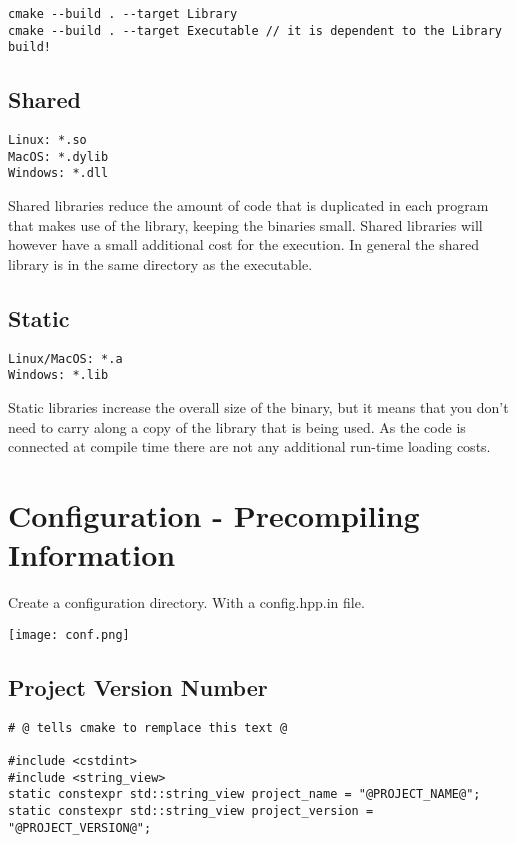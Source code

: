 \begin{verbatim}
cmake --build . --target Library
cmake --build . --target Executable // it is dependent to the Library build!
\end{verbatim}

\subsection{Shared}

\begin{verbatim}
Linux: *.so
MacOS: *.dylib
Windows: *.dll
\end{verbatim}

Shared libraries reduce the amount of code that is duplicated in each program that makes use of the library, keeping the binaries small.
Shared libraries will however have a small additional cost for the execution.
In general the shared library is in the same directory as the executable.

\subsection{Static}

\begin{verbatim}
Linux/MacOS: *.a
Windows: *.lib
\end{verbatim}

Static libraries increase the overall size of the binary, but it means that you don't need to carry along a copy of the library that is being used.
As the code is connected at compile time there are not any additional run-time loading costs.

\section{Configuration - Precompiling Information}

Create a configuration directory. With a config.hpp.in file.

\begin{center}
    \texttt{[image: conf.png]}
\end{center}

\subsection{Project Version Number}

\begin{verbatim}
# @ tells cmake to remplace this text @

#include <cstdint>
#include <string_view> 
static constexpr std::string_view project_name = "@PROJECT_NAME@";
static constexpr std::string_view project_version = "@PROJECT_VERSION@";
\end{verbatim}


